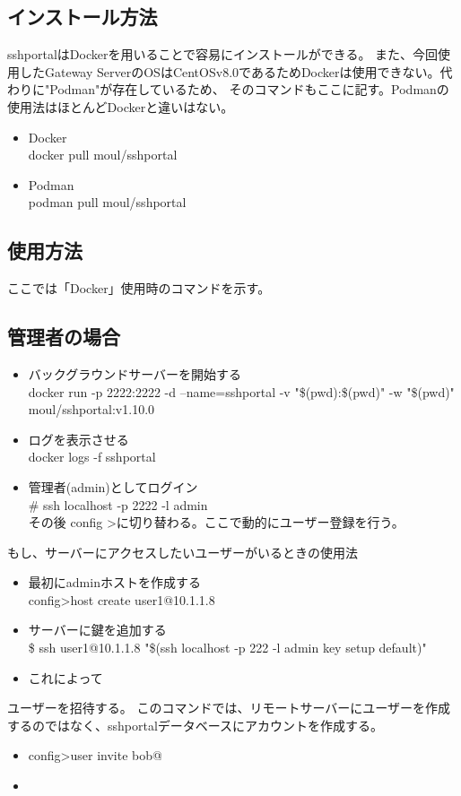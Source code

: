\documentclass[12pt,a4paper,titlepage]{jreport}
\begin{document}
\subsection*{インストール方法}
sshportalはDockerを用いることで容易にインストールができる。
また、今回使用したGateway ServerのOSはCentOSv8.0であるためDockerは使用できない。代わりに"Podman"が存在しているため、
そのコマンドもここに記す。Podmanの使用法はほとんどDockerと違いはない。

\begin{itemize}
    \item Docker\mbox{}\\docker pull moul/sshportal
    \item Podman\mbox{}\\podman pull moul/sshportal
\end{itemize}

\subsection*{使用方法}
ここでは「Docker」使用時のコマンドを示す。
\subsection*{管理者の場合}
\begin{itemize}

    \item バックグラウンドサーバーを開始する \mbox{}\\docker run -p 2222:2222 -d --name=sshportal -v "\$(pwd):\$(pwd)" -w "\$(pwd)" 
    moul/sshportal:v1.10.0
    \item ログを表示させる\mbox{}\\docker logs -f sshportal
    \item 管理者(admin)としてログイン\mbox{}\\ \# ssh localhost -p 2222 -l admin\\その後 config \textgreater に切り替わる。ここで動的にユーザー登録を行う。
    
\end{itemize}
もし、サーバーにアクセスしたいユーザーがいるときの使用法
\begin{itemize}
    \item 最初にadminホストを作成する\mbox{}\\ config\textgreater  host create user1@10.1.1.8
    \item サーバーに鍵を追加する\mbox{} \\ \$ ssh user1@10.1.1.8 "\$(ssh localhost -p 222 -l admin key setup default)"
    \item これによって
\end{itemize}
ユーザーを招待する。
このコマンドでは、リモートサーバーにユーザーを作成するのではなく、sshportalデータベースにアカウントを作成する。
\begin{itemize}
    \item config\textgreater user invite bob@
    \item 
\end{itemize}
\end{document}
